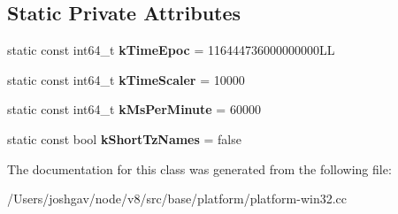 \subsection*{Static Private Attributes}
\begin{DoxyCompactItemize}
\item 
static const int64\+\_\+t {\bfseries k\+Time\+Epoc} = 116444736000000000\+LL\hypertarget{classv8_1_1base_1_1_win32_time_acf233546898ede8a70973989391c7f15}{}\label{classv8_1_1base_1_1_win32_time_acf233546898ede8a70973989391c7f15}

\item 
static const int64\+\_\+t {\bfseries k\+Time\+Scaler} = 10000\hypertarget{classv8_1_1base_1_1_win32_time_a1b75f142e1c2816d10f2a3e9a14bc033}{}\label{classv8_1_1base_1_1_win32_time_a1b75f142e1c2816d10f2a3e9a14bc033}

\item 
static const int64\+\_\+t {\bfseries k\+Ms\+Per\+Minute} = 60000\hypertarget{classv8_1_1base_1_1_win32_time_ab9c0056abd7965eeb1872df76de6036d}{}\label{classv8_1_1base_1_1_win32_time_ab9c0056abd7965eeb1872df76de6036d}

\item 
static const bool {\bfseries k\+Short\+Tz\+Names} = false\hypertarget{classv8_1_1base_1_1_win32_time_a2ff49b8931e65799225ec872bfb3cc5e}{}\label{classv8_1_1base_1_1_win32_time_a2ff49b8931e65799225ec872bfb3cc5e}

\end{DoxyCompactItemize}


The documentation for this class was generated from the following file\+:\begin{DoxyCompactItemize}
\item 
/\+Users/joshgav/node/v8/src/base/platform/platform-\/win32.\+cc\end{DoxyCompactItemize}
